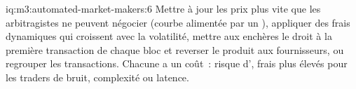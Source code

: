 \begin{solution}{iq:m3:automated-market-makers:6}
Mettre à jour les prix plus vite que les arbitragistes ne peuvent négocier (courbe alimentée par un ), appliquer des frais dynamiques qui croissent avec la volatilité, mettre aux enchères le droit à la
première transaction de chaque bloc et reverser le produit aux fournisseurs, ou regrouper les transactions. Chacune a un coût~: risque d', frais plus élevés pour les
traders de bruit, complexité ou latence.
\end{solution}
